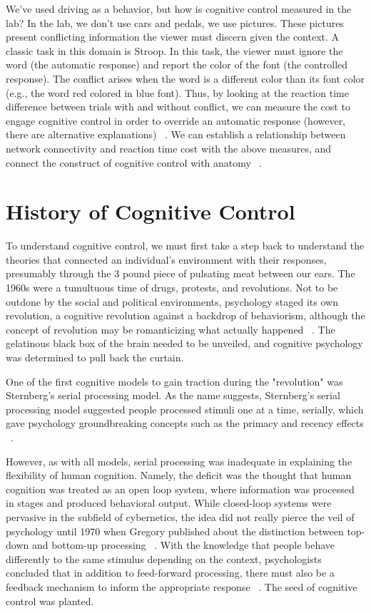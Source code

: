 \documentclass[phd,appendix,figures]{uithesis}
\begin{document}
We've used driving as a behavior, but how is cognitive control measured in the lab?
In the lab, we don't use cars and pedals, we use pictures.
These pictures present conflicting information the viewer must discern given the context.
A classic task in this domain is Stroop.
In this task, the viewer must ignore the word (the automatic response) and report the color of the font (the controlled response).
The conflict arises when the word is a different color than its font color (e.g., the word red colored in blue font).
Thus, by looking at the reaction time difference between trials with  and without conflict, we can measure the cost to engage cognitive control in order to override an automatic response (however, there are alternative explanations) ~\citep{Hommel2011}. 
We can establish a relationship between network connectivity and reaction time cost with the above measures, and connect the construct of cognitive control with anatomy ~\citep{Braver2008,Dosenbach2007}.

\section{History of Cognitive Control}

To understand cognitive control, we must first take a step back to understand the theories that connected an individual's environment with their responses, presumably through the 3 pound piece of pulsating meat between our ears.
The 1960s were a tumultuous time of drugs, protests, and revolutions. 
Not to be outdone by the social and political environments, psychology staged its own revolution, a cognitive revolution against a backdrop of behaviorism, although the concept of revolution may be romanticizing what actually happened ~\citep{Leahey1992}. 
The gelatinous black box of the brain needed to be unveiled, and cognitive psychology was determined to pull back the curtain. 

One of the first cognitive models to gain traction during the "revolution" was Sternberg's serial processing model.
As the name suggests, Sternberg's serial processing model suggested people processed stimuli one at a time, serially, which gave psychology groundbreaking concepts such as the primacy and recency effects ~\citep{Sternberg1966}.

However, as with all models, serial processing was inadequate in explaining the flexibility of human cognition.
Namely, the deficit was the thought that human cognition was treated as an open loop system, where information was processed in stages and produced behavioral output. 
While closed-loop systems were pervasive in the subfield of cybernetics, the idea did not really pierce the veil of psychology until 1970 when Gregory published about the distinction between top-down and bottom-up processing ~\citep{Gregory1970}.
With the knowledge that people behave differently to the same stimulus depending on the context, psychologists concluded that in addition to feed-forward processing, there must also be a feedback mechanism to inform the appropriate response ~\citep{Gregory1970}.
The seed of cognitive control was planted.
\end{document}
